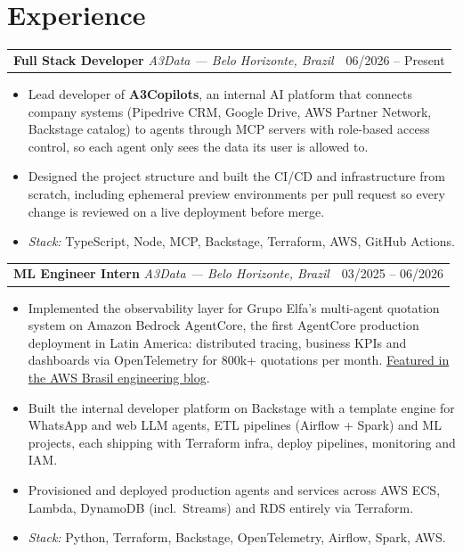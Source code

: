 \documentclass[10pt,a4paper]{article}
\makeatletter
\newcommand{\role}[4]{%
  \par\vspace{1pt}%
  \noindent\begin{tabular*}{\linewidth}[t]{@{}l@{\extracolsep{\fill}}r@{}}
    \textbf{#1} \textit{\textcolor{muted}{#2}} & \textcolor{muted}{#3} \\
  \end{tabular*}\par\nobreak
  \vspace{1pt}#4\par
}
\makeatother
\begin{document}
\section*{Experience}
\role{Full Stack Developer}{A3Data --- Belo Horizonte, Brazil}{06/2026 -- Present}{
  \begin{itemize}
    \item Lead developer of \textbf{A3Copilots}, an internal AI platform that
          connects company systems (Pipedrive CRM, Google Drive, AWS Partner
          Network, Backstage catalog) to agents through MCP servers with
          role-based access control, so each agent only sees the data its user
          is allowed to.
    \item Designed the project structure and built the CI/CD and infrastructure
          from scratch, including ephemeral preview environments per pull
          request so every change is reviewed on a live deployment before merge.
    \item \textit{Stack:} TypeScript, Node, MCP, Backstage, Terraform, AWS, GitHub Actions.
  \end{itemize}
}
\role{ML Engineer Intern}{A3Data --- Belo Horizonte, Brazil}{03/2025 -- 06/2026}{
  \begin{itemize}
    \item Implemented the observability layer for Grupo Elfa's multi-agent
          quotation system on Amazon Bedrock AgentCore, the first AgentCore
          production deployment in Latin America: distributed tracing, business
          KPIs and dashboards via OpenTelemetry for 800k+ quotations per month.
          \href{https://aws.amazon.com/pt/blogs/aws-brasil/grupo-elfa-aplicando-amazon-bedrock-agentcore-para-observabilidade-de-sistema-multiagente-em-escala/}{Featured in the AWS Brasil engineering blog}.
    \item Built the internal developer platform on Backstage with a template
          engine for WhatsApp and web LLM agents, ETL pipelines (Airflow + Spark)
          and ML projects, each shipping with Terraform infra, deploy pipelines,
          monitoring and IAM.
    \item Provisioned and deployed production agents and services across AWS ECS,
          Lambda, DynamoDB (incl.\ Streams) and RDS entirely via Terraform.
    \item \textit{Stack:} Python, Terraform, Backstage, OpenTelemetry, Airflow, Spark, AWS.
  \end{itemize}
}
\end{document}

